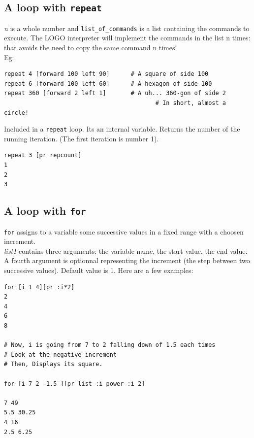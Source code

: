 \subsection{A loop with \texttt{repeat}}
\noindent {} 
\textit{n} is a whole number and \texttt{list\_of\_commands} is a
list containing the commands to execute. The LOGO interpreter will
implement the commands in the list n times: that avoids the need to
copy the same command n times!\\
 Eg: \begin{verbatim}
repeat 4 [forward 100 left 90]      # A square of side 100
repeat 6 [forward 100 left 60]      # A hexagon of side 100
repeat 360 [forward 2 left 1]       # A uh... 360-gon of side 2
                                           # In short, almost a circle!
\end{verbatim}
\noindent
{}
Included in a \texttt{repeat} loop. Its an internal variable. Returns the number of the running iteration. (The first iteration is number 1).

\begin{verbatim}
repeat 3 [pr repcount]
1
2
3
\end{verbatim}
\subsection{A loop with \texttt{for}}
\noindent {}
\texttt{for} assigns to a variable some successive values in a fixed range with a choosen increment.\\
\textit{list1} contains three arguments: the variable name, the start value, the end value.\\
A fourth argument is optionnal representing the increment (the step between two successive values). Default value is 1. Here are a few examples:
\begin{verbatim}
for [i 1 4][pr :i*2]
2
4
6
8

# Now, i is going from 7 to 2 falling down of 1.5 each times
# Look at the negative increment
# Then, Displays its square.

for [i 7 2 -1.5 ][pr list :i power :i 2]
 
7 49
5.5 30.25
4 16
2.5 6.25
\end{verbatim}
